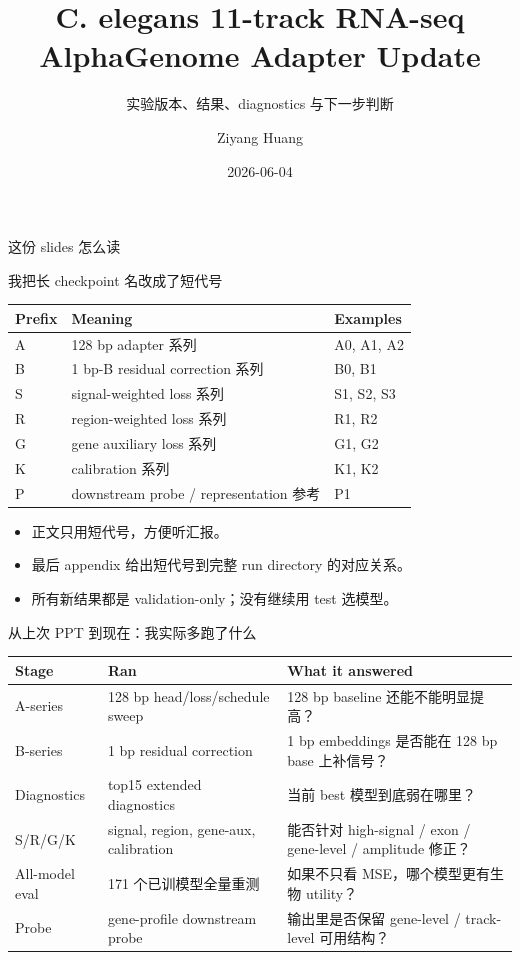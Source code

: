 \documentclass[UTF8,aspectratio=169,10pt]{ctexbeamer}
\title[C. elegans RNA-seq Adapter Update]{C. elegans 11-track RNA-seq\\AlphaGenome Adapter Update}
\subtitle{实验版本、结果、diagnostics 与下一步判断}
\author{Ziyang Huang}
\date{2026-06-04}
\begin{document}
\begin{frame}
  \titlepage
\end{frame}

\begin{frame}{这份 slides 怎么读}
  \begin{block}{我把长 checkpoint 名改成了短代号}
    \begin{tabular}{lll}
      \toprule
      Prefix & Meaning & Examples \\
      \midrule
      A & 128 bp adapter 系列 & A0, A1, A2 \\
      B & 1 bp-B residual correction 系列 & B0, B1 \\
      S & signal-weighted loss 系列 & S1, S2, S3 \\
      R & region-weighted loss 系列 & R1, R2 \\
      G & gene auxiliary loss 系列 & G1, G2 \\
      K & calibration 系列 & K1, K2 \\
      P & downstream probe / representation 参考 & P1 \\
      \bottomrule
    \end{tabular}
  \end{block}

  \begin{itemize}
    \item 正文只用短代号，方便听汇报。
    \item 最后 appendix 给出短代号到完整 run directory 的对应关系。
    \item 所有新结果都是 validation-only；没有继续用 test 选模型。
  \end{itemize}
\end{frame}

\begin{frame}{从上次 PPT 到现在：我实际多跑了什么}
  \begin{center}
  \begin{tabular}{p{}p{}p{}}
    \toprule
    Stage & Ran & What it answered \\
    \midrule
    A-series & 128 bp head/loss/schedule sweep & 128 bp baseline 还能不能明显提高？ \\
    B-series & 1 bp residual correction & 1 bp embeddings 是否能在 128 bp base 上补信号？ \\
    Diagnostics & top15 extended diagnostics & 当前 best 模型到底弱在哪里？ \\
    S/R/G/K & signal, region, gene-aux, calibration & 能否针对 high-signal / exon / gene-level / amplitude 修正？ \\
    All-model eval & 171 个已训模型全量重测 & 如果不只看 MSE，哪个模型更有生物 utility？ \\
    Probe & gene-profile downstream probe & 输出里是否保留 gene-level / track-level 可用结构？ \\
    \bottomrule
  \end{tabular}
  \end{center}
\end{frame}
\end{document}
